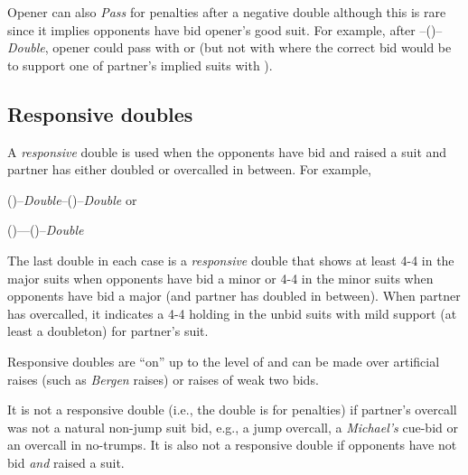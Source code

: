 \documentclass[a4paper,article,oneside]{memoir}
\begin{document}
Opener can also \emph{Pass} for penalties after a negative double
although this is rare since it implies opponents have bid opener's
good suit. For example, after --()--\emph{Double}, opener
could pass with  or 
(but not with  where the correct bid would be
to support one of partner's implied suits with ).

\subsection{Responsive doubles}

A \emph{responsive} double is used when the opponents have bid and
raised a suit and partner has either doubled or overcalled in between. For
example,

()--\emph{Double}--()--\emph{Double} or

()----()--\emph{Double}

The last double in each case is a \emph{responsive} double that shows
at least 4-4 in the major suits when opponents have bid a minor or 4-4
in the minor suits when opponents have bid a major (and partner has doubled
in between). When partner has overcalled, it indicates a 4-4 holding in the
unbid suits with mild support (at least a doubleton) for partner's suit.

Responsive doubles are ``on'' up to the level of  and can be made
over artificial raises (such as \emph{Bergen} raises) or raises of weak two bids.

It is not a responsive double (i.e., the double is for penalties) if partner's overcall
was not a natural non-jump suit bid, e.g., a jump overcall, a \emph{Michael's} cue-bid or
an overcall in no-trumps. It is also not a responsive double if opponents
have not bid \emph{and} raised a suit.
\end{document}
